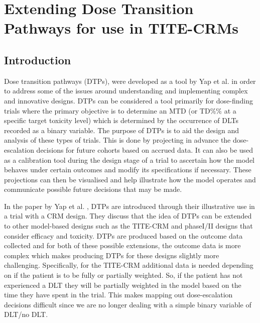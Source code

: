 
\chapter{Extending Dose Transition Pathways for use in TITE-CRMs} %

\label{TITE-DTP} %


\section{Introduction}
\label{tite-dtp:Introduction}

Dose transition pathways (DTPs), were developed as a tool by Yap et al. \cite{yapDoseTransitionPathways2017} in order to address some of the issues around understanding and implementing complex and innovative designs. DTPs can be considered a tool primarily for dose-finding trials where the primary objective is to determine an MTD (or TD\%\% at a specific target toxicity level) which is determined by the occurrence of DLTs recorded as a binary variable. The purpose of DTPs is to aid the design and analysis of these types of trials. This is done by projecting in advance the dose-escalation decisions for future cohorts based on accrued data. It can also be used as a calibration tool during the design stage of a trial to ascertain how the model behaves under certain outcomes and modify its specifications if necessary. These projections can then be visualised and help illustrate how the model operates and communicate possible future decisions that may be made. 

In the paper by Yap et al. \cite{yapDoseTransitionPathways2017}, DTPs are introduced through their illustrative use in a trial with a CRM design. They discuss that the idea of DTPs can be extended to other model-based designs such as the TITE-CRM and phase\RN{1}/\RN{2} designs that consider efficacy and toxicity. DTPs are produced based on the outcome data collected and for both of these possible extensions, the outcome data is more complex which makes producing DTPs for these designs slightly more challenging. Specifically, for the TITE-CRM additional data is needed depending on if the patient is to be fully or partially weighted. So, if the patient has not experienced a DLT they will be partially weighted in the model based on the time they have spent in the trial. This makes mapping out dose-escalation decisions difficult since we are no longer dealing with a simple binary variable of DLT/no DLT. 

